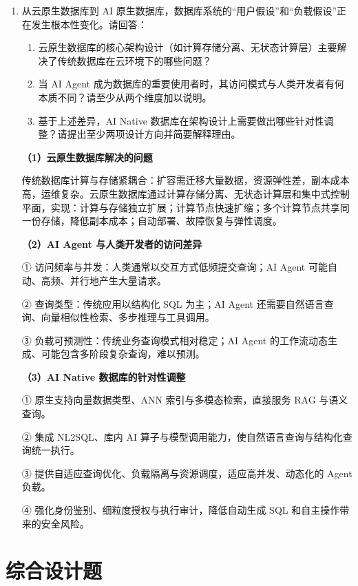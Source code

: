 \documentclass[UTF8,a4paper,11pt]{ctexart}
\newenvironment{answer}%
  {\begin{ans}\noindent{\bfseries\color{ansframe}【答案】}\hspace{0.4em}}%
  {\end{ans}}
\begin{document}
\begin{enumerate}
\item 从云原生数据库到 AI 原生数据库，数据库系统的“用户假设”和“负载假设”正在发生根本性变化。请回答：
\begin{enumerate}
\item 云原生数据库的核心架构设计（如计算存储分离、无状态计算层）主要解决了传统数据库在云环境下的哪些问题？
\item 当 AI Agent 成为数据库的重要使用者时，其访问模式与人类开发者有何本质不同？请至少从两个维度加以说明。
\item 基于上述差异，AI Native 数据库在架构设计上需要做出哪些针对性调整？请提出至少两项设计方向并简要解释理由。
\end{enumerate}
\begin{answer}
\textbf{（1）云原生数据库解决的问题}\par
传统数据库计算与存储紧耦合：扩容需迁移大量数据，资源弹性差，副本成本高，运维复杂。云原生数据库通过计算存储分离、无状态计算层和集中式控制平面，实现：计算与存储独立扩展；计算节点快速扩缩；多个计算节点共享同一份存储，降低副本成本；自动部署、故障恢复与弹性调度。\par
\textbf{（2）AI Agent 与人类开发者的访问差异}\par
① 访问频率与并发：人类通常以交互方式低频提交查询；AI Agent 可能自动、高频、并行地产生大量请求。\par
② 查询类型：传统应用以结构化 SQL 为主；AI Agent 还需要自然语言查询、向量相似性检索、多步推理与工具调用。\par
③ 负载可预测性：传统业务查询模式相对稳定；AI Agent 的工作流动态生成、可能包含多阶段复杂查询，难以预测。\par
\textbf{（3）AI Native 数据库的针对性调整}\par
① 原生支持向量数据类型、ANN 索引与多模态检索，直接服务 RAG 与语义查询。\par
② 集成 NL2SQL、库内 AI 算子与模型调用能力，使自然语言查询与结构化查询统一执行。\par
③ 提供自适应查询优化、负载隔离与资源调度，适应高并发、动态化的 Agent 负载。\par
④ 强化身份鉴别、细粒度授权与执行审计，降低自动生成 SQL 和自主操作带来的安全风险。
\end{answer}

\end{enumerate}

\section{综合设计题}
\end{document}
